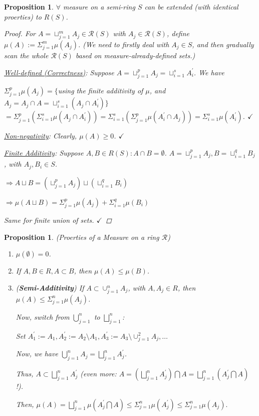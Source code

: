 \documentclass[12pt]{article}
\theoremstyle{blueplain}
\newtheorem{proposition}[theorem]{Proposition}
\theoremstyle{bluedef}
\theoremstyle{blueremark}
\numberwithin{equation}{section}
\begin{document}
\begin{proposition}
  $\forall$ measure on a semi-ring $S$ can be extended (with identical proerties) to $R(S)$.
  \begin{proof}
    For $A = \sqcup_{j=1}^m A_j \in \mathcal{R}(S)$ with $A_j \in \mathcal{R}(S)$, define $\mu(A) := \Sigma_{j=1}^m \mu(A_j)$. (We need to firstly deal with $A_j \in S$, and then gradually scan the whole $\mathcal{R}(S)$ based on measure-already-defined sets.)

    \underline{Well-defined (Correctness)}: Suppose $A = \sqcup_{j=1}^p A_j = \sqcup_{i=1}^s A_i^{\prime}$. We have

    $\Sigma_{j=1}^p \mu(A_j) = \{$using the finite additivity of $\mu$, and $A_j = A_j \cap A = \sqcup_{i=1}^s (A_j \cap A_i^{\prime})\}$ $= \Sigma_{j=1}^p (\Sigma_{i=1}^s \mu(A_j \cap A_i^{\prime})) = \Sigma_{i=1}^s (\Sigma_{j=1}^p \mu(A_i^{\prime} \cap A_j)) = \Sigma_{i=1}^s \mu(A_i^{\prime})$. $\checkmark$

    \underline{Non-negativity}: Clearly, $\mu(A) \geq 0$. $\checkmark$

    \underline{Finite Additivity}: Suppose $A, B \in R(S): A \cap B = \emptyset$.
    $A = \sqcup_{j=1}^p A_j, B = \sqcup_{i=1}^q B_j$, with $A_j, B_i \in S$.

    $\Rightarrow A \sqcup B = (\sqcup_{j=1}^p A_j) \sqcup (\sqcup_{i=1}^q B_i)$

    $\Rightarrow \mu(A \sqcup B) = \Sigma_{j=1}^p \mu(A_j) + \Sigma_{i=1}^q \mu(B_i)$

    Same for finite union of sets. $\checkmark$
  \end{proof}
\end{proposition}

\begin{proposition}
  (Proerties of a Measure on a ring $\mathcal{R}$)

  \begin{enumerate}
    \item $\mu(\emptyset) = 0$.
    \item If $A, B \in R, A \subset B$, then $\mu(A) \leq \mu(B)$.
    \item (\textbf{Semi-Additivity}) If $A \subset \cup_{j=1}^n A_j$, with $A, A_j \in R$, then $\mu(A) \leq \Sigma_{j=1}^n \mu(A_j)$.

          Now, switch from $\bigcup_{j=1}^n$ to $\bigsqcup_{j=1}^n$:

          Set $A_1^{\prime} := A_1, A_2^{\prime} := A_2 \setminus A_1, A_3^{\prime} := A_3 \setminus \cup_{j=1}^2 A_j, \ldots$

          Now, we have $\bigcup_{j=1}^n A_j = \bigsqcup_{j=1}^n A_j^{\prime}$.

          Thus, $A \subset \bigsqcup_{j=1}^n A_j^{\prime}$ (even more: $A = (\bigsqcup_{j=1}^n A_j^{\prime}) \bigcap A = \bigsqcup_{j=1}^n (A_j^{\prime} \bigcap A)$ !).

          Then, \(\mu(A) = \bigsqcup_{j=1}^n \mu(A_j^{\prime} \bigcap A) \leq \Sigma_{j=1}^n \mu(A_j^{\prime}) \leq \Sigma_{j=1}^n \mu(A_j).\)
  \end{enumerate}
\end{proposition}
\end{document}
